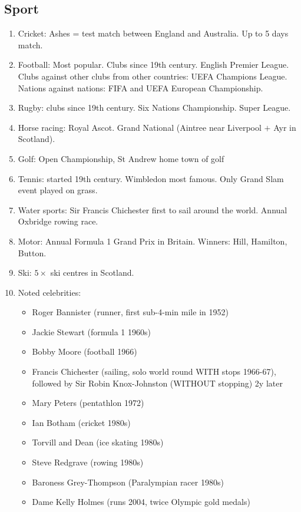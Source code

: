 \documentclass{amsart}
\begin{document}
\subsection{Sport}

\begin{enumerate}
	\item Cricket: Ashes = test match between England and Australia. Up to 5 days match.
	\item Football: Most popular. Clubs since 19th century. English Premier League. Clubs against other clubs from other countries: UEFA Champions League. Nations against nations: FIFA and UEFA European Championship. 
	\item Rugby: clubs since 19th century. Six Nations Championship. Super League. 
	\item Horse racing: Royal Ascot. Grand National (Aintree near Liverpool $+$ Ayr in Scotland).
	\item Golf: Open Championship, St Andrew home town of golf
	\item Tennis: started 19th century. Wimbledon most famous. Only Grand Slam event played on grass.
	\item Water sports: Sir Francis Chichester first to sail around the world. Annual Oxbridge rowing race. 
	\item Motor: Annual Formula 1 Grand Prix in Britain. Winners: Hill, Hamilton, Button. 
	\item Ski: $5\times$ ski centres in Scotland.
	\item Noted celebrities: 
		\begin{itemize}
			\item Roger Bannister (runner, first sub-4-min mile in 1952)		
			\item Jackie Stewart (formula 1 1960s)
			\item Bobby Moore (football 1966)
			\item Francis Chichester (sailing, solo world round WITH stops 1966-67), followed by Sir Robin Knox-Johnston (WITHOUT stopping) 2y later			
			\item Mary Peters (pentathlon 1972)		
			\item Ian Botham (cricket 1980s)
			\item Torvill and Dean (ice skating 1980s) 
			\item Steve Redgrave (rowing 1980s)
			\item Baroness Grey-Thompson (Paralympian racer 1980s)
			\item Dame Kelly Holmes (runs 2004, twice Olympic gold medals)

\end{itemize}
\end{enumerate}
\end{document}
